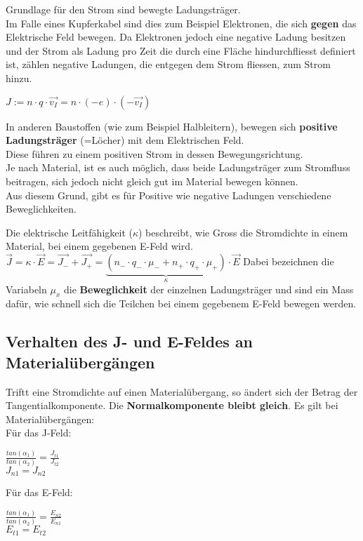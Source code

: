 					Grundlage für den Strom sind bewegte Ladungsträger. \\
					Im Falle eines Kupferkabel sind dies zum Beispiel Elektronen, die sich \textbf{gegen} das
					Elektrische Feld bewegen. Da Elektronen jedoch eine negative Ladung besitzen und der Strom als Ladung pro Zeit die durch eine Fläche hindurchfliesst definiert ist, zählen negative Ladungen, die entgegen dem Strom fliessen, zum Strom hinzu.

					\begin{center}
						$\displaystyle J := n \cdot q \cdot \vec{v_I} = n \cdot (-e) \cdot (-\vec{v_I}) $
					\end{center}

					In anderen Baustoffen (wie zum Beispiel Halbleitern), bewegen sich \textbf{positive Ladungsträger} (=Löcher) mit dem Elektrischen Feld. \\
					Diese führen zu einem positiven Strom in dessen Bewegungsrichtung. \\
					Je nach Material, ist es auch möglich, dass beide Ladungsträger zum Stromfluss beitragen, sich jedoch nicht gleich gut im Material bewegen können. \\
					Aus diesem Grund, gibt es für Positive wie negative Ladungen verschiedene Beweglichkeiten.

					\beginip
					Die elektrische Leitfähigkeit ($\kappa$) beschreibt, wie Gross die Stromdichte in einem Material, bei einem gegebenen E-Feld wird. \\
					\formulaBegin
					$\displaystyle \vec{J} = \kappa \cdot \vec{E} = \vec{J_{-}} + \vec{J_{+}} = \underbrace{(n_{-} \cdot q_{-} \cdot \mu_- + n_+ \cdot q_+ \cdot \mu_{+})}_{\kappa} \cdot \vec{E}$
					\formulaEnd
					Dabei bezeichnen die Variabeln $\mu_{x}$ die \textbf{Beweglichkeit} der einzelnen Ladungsträger und sind ein Mass dafür, wie schnell sich die Teilchen bei einem gegebenem E-Feld bewegen werden.
					\iend


					\subsection{Verhalten des J- und E-Feldes an Materialübergängen}
					Triftt eine Stromdichte auf einen Materialübergang, so ändert sich der Betrag der Tangentialkomponente. Die \textbf{Normalkomponente bleibt gleich}.
					\begingl
					Es gilt bei Materialübergängen: \\
					Für das J-Feld:
					\fspace
					\formulaBegin

					$\displaystyle \frac{tan(\alpha_1)}{tan(\alpha_2)} = \frac{J_{t1}}{J_{t2}}  $ \\
					\fspace
					$\displaystyle J_{n1} = J_{n2}$

					\formulaEnd

					Für das E-Feld:
					\fspace
					\formulaBegin

										$\displaystyle \frac{tan(\alpha_1)}{tan(\alpha_2)} = \frac{E_{n2}}{E_{n1}}  $ \\
										\fspace
										$\displaystyle E_{t1} = E_{t2}$

					\formulaEnd
					\iend
